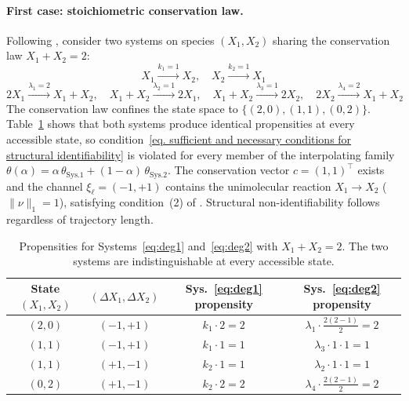 \paragraph{First case: stoichiometric conservation law.} Following \cite{enciso2021identifiability}, consider two systems on species $(X_1,X_2)$ sharing the conservation law $X_1+X_2=2$:
\begin{equation}
X_1\xrightarrow{k_1=1}X_2,\quad X_2\xrightarrow{k_2=1}X_1
\label{eq:deg1}
\end{equation}
\begin{equation}
2X_1\xrightarrow{\lambda_1=2}X_1+X_2,\quad X_1+X_2\xrightarrow{\lambda_2=1}2X_1,\quad
X_1+X_2\xrightarrow{\lambda_3=1}2X_2,\quad 2X_2\xrightarrow{\lambda_4=2}X_1+X_2
\label{eq:deg2}
\end{equation}
The conservation law confines the state space to $\{(2,0),(1,1),(0,2)\}$. Table~\ref{tab:degenerate} shows that both systems produce identical propensities at every accessible state, so condition~\eqref{eq. sufficient and necessary conditions for structural identifiability} is violated for every member of the interpolating family $\theta(\alpha)=\alpha\,\theta_{\text{Sys.1}}+(1-\alpha)\,\theta_{\text{Sys.2}}$. The conservation vector $c=(1,1)^\top$ exists and the channel $\xi_\ell=(-1,+1)$ contains the unimolecular reaction $X_1\to X_2$ ($\|\nu\|_1=1$), satisfying condition~(2) of . Structural non-identifiability follows regardless of trajectory length.

\begin{table}[h!]
\centering
\begin{tabular}{|c|c|c|c|}
\hline
State $(X_1,X_2)$ & $(\Delta X_1,\Delta X_2)$ & Sys.~\eqref{eq:deg1} propensity & Sys.~\eqref{eq:deg2} propensity \\
\hline
$(2,0)$ & $(-1,+1)$ & $k_1\cdot 2=2$ & $\lambda_1\cdot\tfrac{2(2-1)}{2}=2$ \\
$(1,1)$ & $(-1,+1)$ & $k_1\cdot 1=1$ & $\lambda_3\cdot 1\cdot 1=1$ \\
$(1,1)$ & $(+1,-1)$ & $k_2\cdot 1=1$ & $\lambda_2\cdot 1\cdot 1=1$ \\
$(0,2)$ & $(+1,-1)$ & $k_2\cdot 2=2$ & $\lambda_4\cdot\tfrac{2(2-1)}{2}=2$ \\
\hline
\end{tabular}
\caption{Propensities for Systems~\eqref{eq:deg1} and~\eqref{eq:deg2} with $X_1+X_2=2$. The two systems are indistinguishable at every accessible state.}
\label{tab:degenerate}
\end{table}

